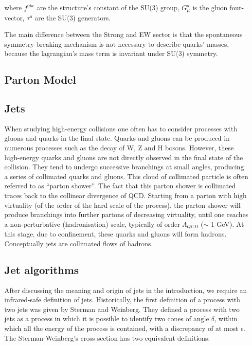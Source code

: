 where $f^{abc}$ are the structure's constant of the SU(3) group, $G^a_{\mu}$ is the gluon four-vector, 
$\tau^a$ are the SU(3) generators.

The main difference between the Strong and EW sector is that the spontaneous symmetry breaking 
mechanism is not necessary to describe quarks' masses, because the lagrangian's mass term is invariant 
under SU(3) symmetry.

\subsection{Parton Model}


\subsection{Jets}

When studying high-energy collisions one often has to consider processes with gluons and quarks in the final state.
Quarks and gluons can be produced in numerous processes such as the decay of W, Z and H bosons.
However, these high-energy quarks and gluons are not directly observed in the final state of the collision.
They tend to undergo successive branchings at small angles, producing a series of collimated quarks and gluons. 
This cloud of collimated particle is often referred to as “parton shower".
The fact that this parton shower is collimated traces back to the collinear divergence of QCD.
Starting from a parton with high virtuality (of the order of the hard scale of the process), 
the parton shower will produce branchings into further partons of decreasing virtuality, 
until one reaches a non-perturbative (hadronisation) scale, typically of order $\Lambda_{QCD}$ ($\sim$ 1 GeV).
At this stage, due to confinement, these quarks and gluons will form hadrons.
Conceptually jets are collimated flows of hadrons.

\subsection{Jet algorithms}

After discussing the meaning and origin of jets in the introduction, we require an infrared-safe definition of 
jets. Historically, the first definition of a process with two jets was given by Sterman and Weinberg. 
They defined a process with two jets as a process in which it is possible to identify two cones of angle $\delta$, 
within which all the energy of the process is contained, with a discrepancy of at most $\epsilon$.
The Sterman-Weinberg's cross section has two equivalent definitions:

